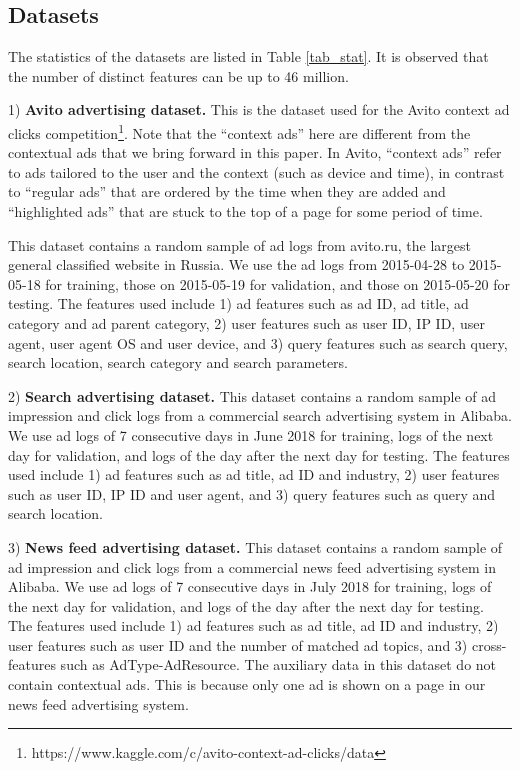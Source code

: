 \documentclass[sigconf]{acmart}
\begin{document}
\subsection{Datasets}
The statistics of the datasets are listed in Table \ref{tab_stat}. It is observed that the number of distinct features can be up to 46 million.

1) \textbf{Avito advertising dataset.}
This is the dataset used for the Avito context ad clicks competition\footnote{https://www.kaggle.com/c/avito-context-ad-clicks/data}. Note that the ``context ads'' here are different from the contextual ads that we bring forward in this paper.
In Avito, ``context ads'' refer to ads tailored to the user and the context (such as device and time), in contrast to ``regular ads'' that are ordered by the time when they are added and ``highlighted ads'' that are stuck to the top of a page for some period of time.

This dataset contains a random sample of ad logs from avito.ru, the largest general classified website in Russia.
We use the ad logs from 2015-04-28 to 2015-05-18 for training, those on 2015-05-19 for validation, and those on 2015-05-20 for testing.
The features used include 1) ad features such as ad ID, ad title, ad category and ad parent category, 2) user features such as user ID, IP ID, user agent, user agent OS and user device, and 3) query features such as search query, search location, search category and search parameters.

2) \textbf{Search advertising dataset.}
This dataset contains a random sample of ad impression and click logs from a commercial search advertising system in Alibaba. We use ad logs of 7 consecutive days in June 2018 for training, logs of the next day for validation, and logs of the day after the next day for testing.
The features used include 1) ad features such as ad title, ad ID and industry, 2) user features such as user ID, IP ID and user agent, and 3) query features such as query and search location.

3) \textbf{News feed advertising dataset.}
This dataset contains a random sample of ad impression and click logs from a commercial news feed advertising system in Alibaba.
We use ad logs of 7 consecutive days in July 2018 for training, logs of the next day for validation, and logs of the day after the next day for testing.
The features used include 1) ad features such as ad title, ad ID and industry, 2) user features such as user ID and the number of matched ad topics, and 3) cross-features such as AdType-AdResource.
The auxiliary data in this dataset do not contain contextual ads. This is because only one ad is shown on a page in our news feed advertising system.
\end{document}
